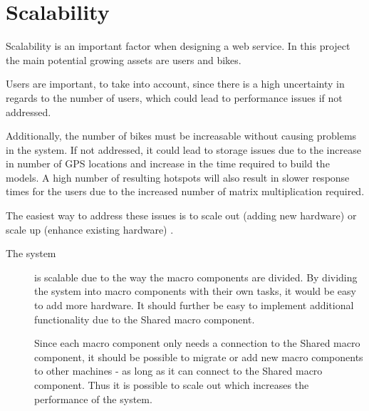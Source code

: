 \section{Scalability}
Scalability is an important factor when designing a web service. In this project the main potential growing assets are users and bikes.

Users are important, to take into account, since there is a high uncertainty in regards to the number of users, which could lead to performance issues if not addressed.

Additionally, the number of bikes must be increasable without causing problems in the system. If not addressed, it could lead to storage issues due to the increase in number of GPS locations and increase in the time required to build the models.
A high number of resulting hotspots will also result in slower response times for the users due to the increased number of matrix multiplication required.

The easiest way to address these issues is to scale out (adding new hardware) or scale up (enhance existing hardware) \cite{michael2007scale}. 

\begin{description}
\item[The system] is scalable due to the way the macro components are divided. By dividing the system into macro components with their own tasks, it would be easy to add more hardware. It should further be easy to implement additional functionality due to the Shared macro component.

Since each macro component only needs a connection to the Shared macro component, it should be possible to migrate or add new macro components to other machines - as long as it can connect to the Shared macro component.
Thus it is possible to scale out which increases the performance of the system.
\end{description}